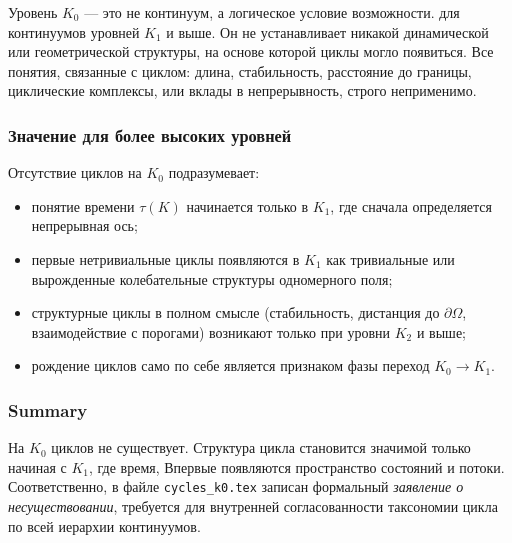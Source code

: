 Уровень $K_0$ — это не континуум, а логическое условие возможности.
для континуумов уровней $K_1$ и выше.
Он не устанавливает никакой динамической или геометрической структуры, на основе которой циклы
могло появиться.
Все понятия, связанные с циклом: длина, стабильность, расстояние до границы,
циклические комплексы, или вклады в непрерывность, строго
неприменимо.

\subsubsection{Значение для более высоких уровней}

Отсутствие циклов на $K_0$ подразумевает:
\begin{itemize}
  \item понятие времени $\tau(K)$ начинается только в $K_1$, где
        сначала определяется непрерывная ось;
  \item первые нетривиальные циклы появляются в $K_1$ как тривиальные или
        вырожденные колебательные структуры одномерного поля;
  \item структурные циклы в полном смысле (стабильность, дистанция до
        $\partial\Omega$, взаимодействие с порогами) возникают только при
        уровни $K_2$ и выше;
  \item рождение циклов само по себе является признаком фазы
        переход $K_0\to K_1$.
\end{itemize}

\subsubsection{Summary}

На $K_0$ циклов не существует.
Структура цикла становится значимой только начиная с $K_1$, где время,
Впервые появляются пространство состояний и потоки.
Соответственно, в файле \texttt{cycles\_k0.tex} записан формальный
\emph{заявление о несуществовании}, требуется для внутренней согласованности
таксономии цикла по всей иерархии континуумов.
